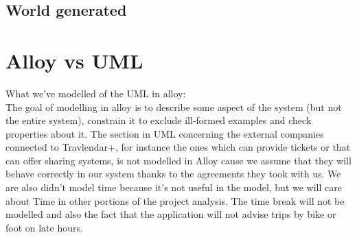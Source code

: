 %
\begin{landscape}
\section{World generated}
\begin{center}
\thispagestyle{empty}
\end{center}
\end{landscape}
%
\section{Alloy vs UML}
What we’ve modelled of the UML in alloy: \\
The goal of modelling in alloy is to describe some aspect of the system (but not the entire system), constrain it to exclude ill-formed examples and check properties about it.
The section in UML concerning the external companies connected to Travlendar+, for instance the ones which can provide tickets or that can offer sharing systems, is not modelled in Alloy cause we assume that they will behave correctly in our system thanks to the agreements they took with us.
We are also didn’t model time because it’s not useful in the model, but we will care about Time in other portions of the project analysis. The time break will not be modelled and also the fact that the application will not advise trips by bike or foot on late hours.
%
